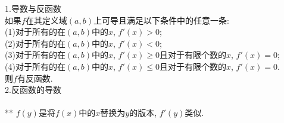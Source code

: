 \documentclass[UTF8, fontset=ubuntu]{ctexart}
\begin{document}
1.导数与反函数\\
如果$f$在其定义域$(a,b)$上可导且满足以下条件中的任意一条:\\
(1)对于所有的在$(a,b)$中的$x$, $f'(x)>0$;\\
(2)对于所有的在$(a,b)$中的$x$, $f'(x)<0$;\\
(3)对于所有的在$(a,b)$中的$x$, $f'(x)\geqslant 0$且对于有限个数的$x$, $f'(x)=0$;\\
(4)对于所有的在$(a,b)$中的$x$, $f'(x)\leqslant 0$且对于有限个数的$x$, $f'(x)=0$.\\
则$f$有反函数.\\[2ex]

2.反函数的导数\\[1ex]
\\[1ex]
** $f(y)$是将$f(x)$中的$x$替换为$y$的版本, $f'(y)$类似.\\[2ex]
\end{document}
